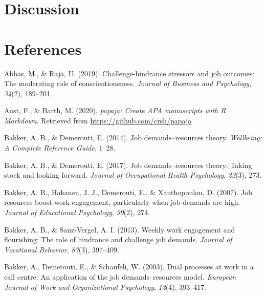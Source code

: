\documentclass[
  english,
  man]{apa6}
\begin{document}
\hypertarget{discussion-1}{%
\section{Discussion}\label{discussion-1}}

\newpage

\hypertarget{references}{%
\section{References}\label{references}}

\begingroup
\setlength{\parindent}{-0.5in}
\setlength{\leftskip}{0.5in}

\hypertarget{refs}{}
\leavevmode\hypertarget{ref-abbas2019challenge}{}%
Abbas, M., \& Raja, U. (2019). Challenge-hindrance stressors and job outcomes: The moderating role of conscientiousness. \emph{Journal of Business and Psychology}, \emph{34}(2), 189--201.

\leavevmode\hypertarget{ref-R-papaja}{}%
Aust, F., \& Barth, M. (2020). \emph{papaja: Create APA manuscripts with R Markdown}. Retrieved from \url{https://github.com/crsh/papaja}

\leavevmode\hypertarget{ref-bakker2014job}{}%
Bakker, A. B., \& Demerouti, E. (2014). Job demands--resources theory. \emph{Wellbeing: A Complete Reference Guide}, 1--28.

\leavevmode\hypertarget{ref-bakker2017job}{}%
Bakker, A. B., \& Demerouti, E. (2017). Job demands--resources theory: Taking stock and looking forward. \emph{Journal of Occupational Health Psychology}, \emph{22}(3), 273.

\leavevmode\hypertarget{ref-bakker2007job}{}%
Bakker, A. B., Hakanen, J. J., Demerouti, E., \& Xanthopoulou, D. (2007). Job resources boost work engagement, particularly when job demands are high. \emph{Journal of Educational Psychology}, \emph{99}(2), 274.

\leavevmode\hypertarget{ref-bakker2013weekly}{}%
Bakker, A. B., \& Sanz-Vergel, A. I. (2013). Weekly work engagement and flourishing: The role of hindrance and challenge job demands. \emph{Journal of Vocational Behavior}, \emph{83}(3), 397--409.

\leavevmode\hypertarget{ref-bakker2003dual}{}%
Bakker, A., Demerouti, E., \& Schaufeli, W. (2003). Dual processes at work in a call centre: An application of the job demands--resources model. \emph{European Journal of Work and Organizational Psychology}, \emph{12}(4), 393--417.
\end{document}

